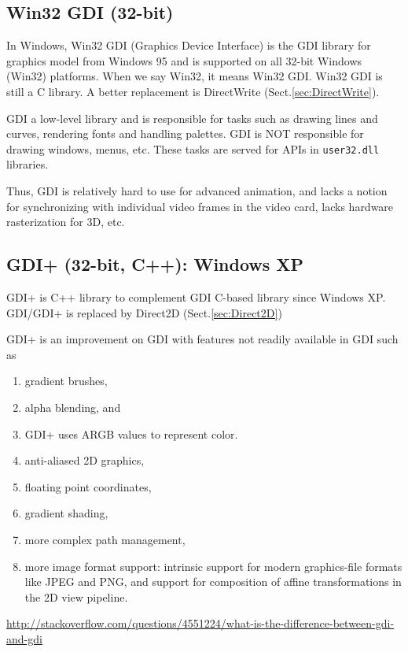 \subsection{Win32 GDI (32-bit)}
\label{sec:Win32GDI}

In Windows, Win32 GDI (Graphics Device Interface) is the GDI library for graphics
model from Windows 95 and is supported on all 32-bit Windows (Win32) platforms.
When we say Win32, it means Win32 GDI. Win32 GDI is still a C library. 
A better replacement is DirectWrite (Sect.\ref{sec:DirectWrite}). 

\begin{mdframed}

GDI a low-level library and is responsible for tasks such as drawing lines and
curves, rendering fonts and handling palettes.
GDI is NOT responsible for drawing windows, menus, etc. These tasks are served
for APIs in \verb!user32.dll! libraries.

Thus, GDI is relatively hard to use for advanced animation, and lacks a notion
for synchronizing with individual video frames in the video card, lacks hardware
rasterization for 3D, etc.
\end{mdframed}



\subsection{GDI+ (32-bit, C++): Windows XP}
\label{sec:GDI+}

GDI+ is C++ library to complement GDI C-based library since Windows XP.
GDI/GDI+ is replaced by Direct2D (Sect.\ref{sec:Direct2D})

GDI+ is an improvement on GDI with features not readily available
in GDI such as 
\begin{enumerate}
  \item gradient brushes, 
  
  \item alpha blending, and 

  \item GDI+ uses  ARGB values to represent color.

 \item anti-aliased 2D graphics, 
 
 \item floating point coordinates,

  \item gradient shading, 
  
  \item more complex path management, 
  
  \item more image format support: intrinsic support for modern graphics-file
  formats like JPEG and PNG, and support for composition of affine
  transformations in the 2D view pipeline.
 
\end{enumerate}
\url{http://stackoverflow.com/questions/4551224/what-is-the-difference-between-gdi-and-gdi}

